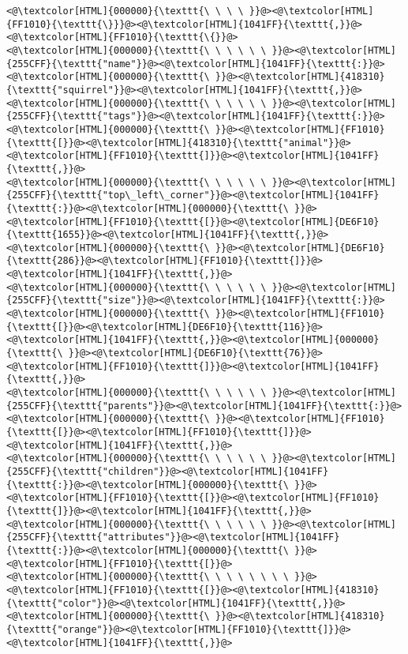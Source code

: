 \begin{lstlisting}
<@\textcolor[HTML]{000000}{\texttt{\ \ \ \ }}@><@\textcolor[HTML]{FF1010}{\texttt{\}}}@><@\textcolor[HTML]{1041FF}{\texttt{,}}@> <@\textcolor[HTML]{FF1010}{\texttt{\{}}@>
<@\textcolor[HTML]{000000}{\texttt{\ \ \ \ \ \ }}@><@\textcolor[HTML]{255CFF}{\texttt{"name"}}@><@\textcolor[HTML]{1041FF}{\texttt{:}}@><@\textcolor[HTML]{000000}{\texttt{\ }}@><@\textcolor[HTML]{418310}{\texttt{"squirrel"}}@><@\textcolor[HTML]{1041FF}{\texttt{,}}@>
<@\textcolor[HTML]{000000}{\texttt{\ \ \ \ \ \ }}@><@\textcolor[HTML]{255CFF}{\texttt{"tags"}}@><@\textcolor[HTML]{1041FF}{\texttt{:}}@><@\textcolor[HTML]{000000}{\texttt{\ }}@><@\textcolor[HTML]{FF1010}{\texttt{[}}@><@\textcolor[HTML]{418310}{\texttt{"animal"}}@><@\textcolor[HTML]{FF1010}{\texttt{]}}@><@\textcolor[HTML]{1041FF}{\texttt{,}}@>
<@\textcolor[HTML]{000000}{\texttt{\ \ \ \ \ \ }}@><@\textcolor[HTML]{255CFF}{\texttt{"top\_left\_corner"}}@><@\textcolor[HTML]{1041FF}{\texttt{:}}@><@\textcolor[HTML]{000000}{\texttt{\ }}@><@\textcolor[HTML]{FF1010}{\texttt{[}}@><@\textcolor[HTML]{DE6F10}{\texttt{1655}}@><@\textcolor[HTML]{1041FF}{\texttt{,}}@><@\textcolor[HTML]{000000}{\texttt{\ }}@><@\textcolor[HTML]{DE6F10}{\texttt{286}}@><@\textcolor[HTML]{FF1010}{\texttt{]}}@><@\textcolor[HTML]{1041FF}{\texttt{,}}@>
<@\textcolor[HTML]{000000}{\texttt{\ \ \ \ \ \ }}@><@\textcolor[HTML]{255CFF}{\texttt{"size"}}@><@\textcolor[HTML]{1041FF}{\texttt{:}}@><@\textcolor[HTML]{000000}{\texttt{\ }}@><@\textcolor[HTML]{FF1010}{\texttt{[}}@><@\textcolor[HTML]{DE6F10}{\texttt{116}}@><@\textcolor[HTML]{1041FF}{\texttt{,}}@><@\textcolor[HTML]{000000}{\texttt{\ }}@><@\textcolor[HTML]{DE6F10}{\texttt{76}}@><@\textcolor[HTML]{FF1010}{\texttt{]}}@><@\textcolor[HTML]{1041FF}{\texttt{,}}@>
<@\textcolor[HTML]{000000}{\texttt{\ \ \ \ \ \ }}@><@\textcolor[HTML]{255CFF}{\texttt{"parents"}}@><@\textcolor[HTML]{1041FF}{\texttt{:}}@><@\textcolor[HTML]{000000}{\texttt{\ }}@><@\textcolor[HTML]{FF1010}{\texttt{[}}@><@\textcolor[HTML]{FF1010}{\texttt{]}}@><@\textcolor[HTML]{1041FF}{\texttt{,}}@>
<@\textcolor[HTML]{000000}{\texttt{\ \ \ \ \ \ }}@><@\textcolor[HTML]{255CFF}{\texttt{"children"}}@><@\textcolor[HTML]{1041FF}{\texttt{:}}@><@\textcolor[HTML]{000000}{\texttt{\ }}@><@\textcolor[HTML]{FF1010}{\texttt{[}}@><@\textcolor[HTML]{FF1010}{\texttt{]}}@><@\textcolor[HTML]{1041FF}{\texttt{,}}@>
<@\textcolor[HTML]{000000}{\texttt{\ \ \ \ \ \ }}@><@\textcolor[HTML]{255CFF}{\texttt{"attributes"}}@><@\textcolor[HTML]{1041FF}{\texttt{:}}@><@\textcolor[HTML]{000000}{\texttt{\ }}@><@\textcolor[HTML]{FF1010}{\texttt{[}}@>
<@\textcolor[HTML]{000000}{\texttt{\ \ \ \ \ \ \ \ }}@><@\textcolor[HTML]{FF1010}{\texttt{[}}@><@\textcolor[HTML]{418310}{\texttt{"color"}}@><@\textcolor[HTML]{1041FF}{\texttt{,}}@><@\textcolor[HTML]{000000}{\texttt{\ }}@><@\textcolor[HTML]{418310}{\texttt{"orange"}}@><@\textcolor[HTML]{FF1010}{\texttt{]}}@><@\textcolor[HTML]{1041FF}{\texttt{,}}@>

\end{lstlisting}
